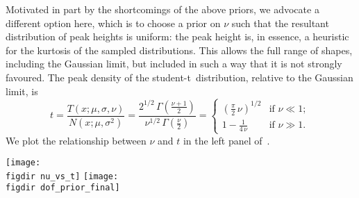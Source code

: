 \documentclass[a4paper,fleqn,usenatbib]{mnras}
\newcommand{\tpeak}{t}
\newcommand{\studentdist}{student-t}
\begin{document}
{\begin{itemize}
\end{itemize}

Motivated in part by the shortcomings of the above priors,
we advocate a different option here,
which is to choose a prior on $\nu$ such that the 
resultant distribution of peak heights is uniform: the peak height is, 
in essence, a heuristic for the kurtosis of the sampled distributions.
This allows the full range of shapes, including the Gaussian limit, 
but included in such a way that it is not strongly favoured.
The peak density of the \studentdist\ distribution,
relative to the Gaussian limit, is 
\begin{equation}
\label{equation:tpeak}
\tpeak = \frac{T(x; \mu, \sigma, \nu)}{N(x; \mu, \sigma^2)} =  
\frac{2^{1/2} \, \Gamma\left(\frac{\nu + 1}{2}\right)}{\nu^{1/2} \, \Gamma\left(\frac{\nu}{2}\right)}
= \begin{cases}
\left( \frac{\pi}{2} \, \nu \right)^{1/2} & \text{if } \nu \ll 1;\\
1 - \frac{1}{4 \, \nu} & \text{if } \nu \gg 1.
  \end{cases}
\end{equation}
We plot the relationship between $\nu$ and $\tpeak$ in the left panel of~.

\begin{figure*}
\texttt{[image: \\figdir nu\_vs\_t]}
\texttt{[image: \\figdir dof\_prior\_final]}
\caption{Left: relationship between our \studentdist\ kurtosis heuristic -- the peak density of the \studentdist\ distribution relative to the Gaussian limit -- and the distribution's degrees of freedom. The limiting cases described in~ are highlighted in dashed orange. Right: priors considered for the degrees of freedom of the heavy-tailed Cepheid and SN intrinsic scatter distributions.}
\label{figure:dof_prior}
\end{figure*}

}
\end{document}
